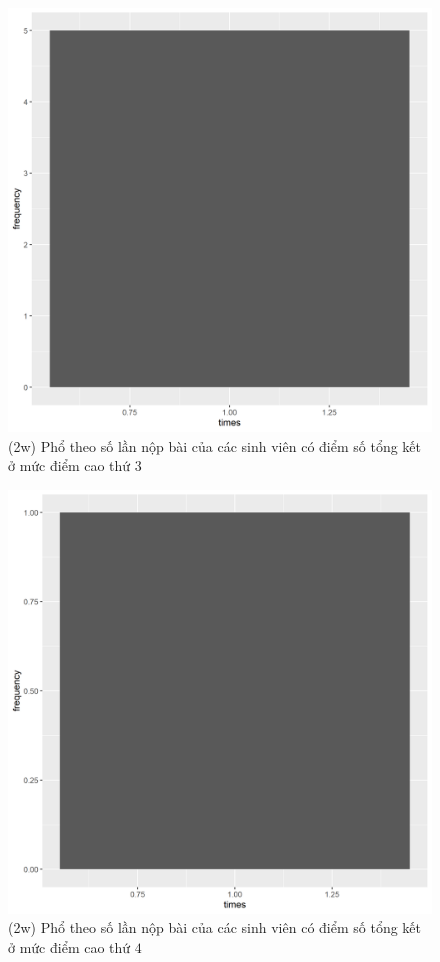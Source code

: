\documentclass[a4paper]{article}
\theoremstyle{definition}
\begin{document}
\begin{figure}[!ht]
    \centering
    \includegraphics[scale=0.4]{Pics/q2w-3-file4.png}
    \caption{(2w) Phổ theo số lần nộp bài của các sinh viên có điểm số tổng kết ở mức điểm cao thứ $3$}
    \label{fig:my_label}
\end{figure}
\begin{figure}[!ht]
    \centering
    \includegraphics[scale=0.4]{Pics/q2w-4-file4.png}
    \caption{(2w) Phổ theo số lần nộp bài của các sinh viên có điểm số tổng kết ở mức điểm cao thứ $4$}
    \label{fig:my_label}
\end{figure}
\end{document}
